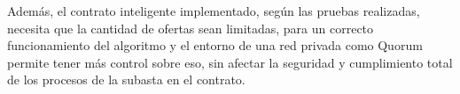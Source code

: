 \begin{conclusions}
    Además, el contrato inteligente implementado, según las pruebas realizadas, necesita que la cantidad
    de ofertas sean limitadas, para un correcto funcionamiento del algoritmo y el entorno de una red
    privada como Quorum permite tener más control sobre eso, sin afectar la seguridad y cumplimiento
    total de los procesos de la subasta en el contrato.
\end{conclusions}
